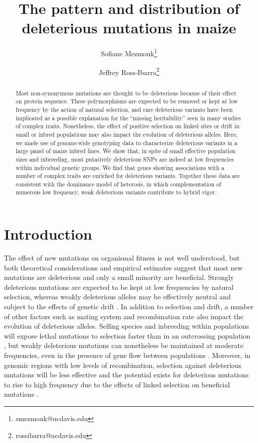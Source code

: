 \documentclass[12pt]{article}
\title{The pattern and distribution of deleterious mutations in maize}
\author[1]{Sofiane Mezmouk\thanks{smezmouk@ucdavis.edu}}
\author[1,2]{Jeffrey Ross-Ibarra\thanks{rossibarra@ucdavis.edu}}
\affil[1]{Department of Plant Sciences, University of California Davis}
\affil[2]{Center for Population Biology and Genome Center, University of California Davis}
\date{}
\begin{document}
\maketitle


\begin{abstract} 
Most non-synonymous mutations are thought to be deleterious because of their effect on protein sequence.  
These polymorphisms are expected to be removed or kept at low frequency by the action of natural selection, and rare deleterious variants have been implicated as a possible explanation for the ``missing heritability'' seen in many studies of complex traits. Nonetheless, the effect of positive selection on linked sites or drift in small or inbred populations may also impact the evolution of deleterious alleles. 
Here, we made use of genome-wide genotyping data to characterize deleterious variants in a large panel of maize inbred lines.  
We show that, in spite of small effective population sizes and inbreeding, most  putatively deleterious SNPs are indeed at low frequencies within individual genetic groups. 
We find that genes showing associations with a number of complex traits are enriched for deleterious variants. 
Together these data are consistent with the dominance model of heterosis, in which complementation of numerous low frequency, weak deleterious variants contribute to hybrid vigor.
\end{abstract}

\newpage
\section*{Introduction}

The effect of new mutations on organismal fitness is not well understood, but both theoretical considerations \citep{Fisher1930} and empirical estimates \citep{Joseph2004} suggest that most new mutations are deleterious and only a small minority are beneficial. Strongly deleterious mutations are expected to be kept at low frequencies by natural selection, whereas weakly deleterious alleles may be effectively neutral \citep{Ohta1973, Kimura1983} and subject to the effects of genetic drift \citep{Lynch1990,Lande1994,Whitlock2003}. In addition to selection and drift, a number of other factors such as mating system and recombination rate also impact the evolution of deleterious alleles. Selfing species and inbreeding within populations will expose lethal mutations to selection faster than in an outcrossing population \citep{Wang1999,Glemin2003}, but weakly deleterious mutations  can nonetheless be maintained at moderate frequencies, even in the presence of gene flow between populations \citep{Whitlock2000}. Moreover, in genomic regions with low levels of recombination, selection against deleterious mutations will be less effective \citep{Charlesworth1993fp} and the potential exists for deleterious mutations to rise to high frequency due to the effects of linked selection on beneficial mutations \citep{Felsenstein1974, Hill1966, Chun2011}. 
 
\end{document}
